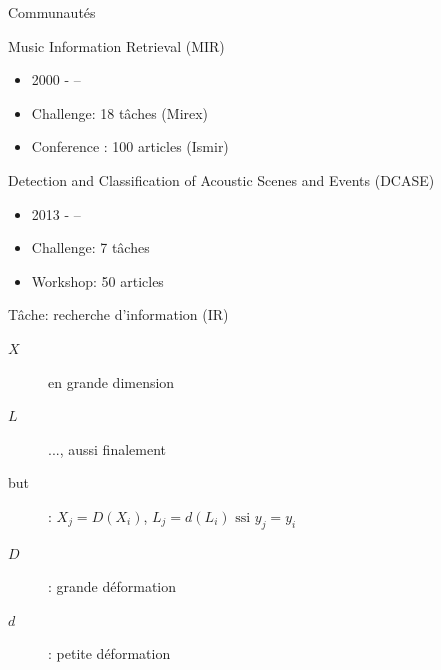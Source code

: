 \begin{frame}{Communautés}
\begin{block}{Music Information Retrieval (MIR)}
\begin{itemize}
\item 2000 - --
\item Challenge: 18 tâches  (Mirex)
\item Conference : 100 articles (Ismir)
\end{itemize}
\end{block}
\begin{block}{Detection and Classification of
Acoustic Scenes and Events (DCASE)}
\begin{itemize}
\item 2013 - --
\item Challenge: 7 tâches
\item Workshop: 50 articles
\end{itemize}
\end{block}
\end{frame}

\begin{frame}{Tâche: recherche d'information (IR)}
\begin{center}
\end{center}
\vspace{.8cm}
\begin{description}
\item[$X$] en grande dimension
\item[$L$] ..., aussi finalement
\item[but]: $X_j=D(X_i)$, $L_j=d(L_i) \text{ ssi } y_j=y_i$
\item[$D$]: grande déformation
\item[$d$]: petite déformation
\end{description}
\end{frame}


